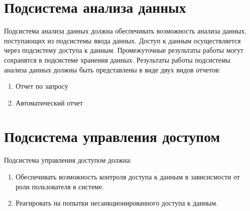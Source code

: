 \section{Подсистема анализа данных}
Подсистема анализа данных должна обеспечивать возможность анализа данных,
поступающих из подсистемы ввода данных. Доступ к данным осуществляется через
подсистему доступа к данным. Промежуточные результаты работы могут сохранятся в
подсистеме хранения данных.
Результаты работы подсистемы анализа данных должны быть представлены в виде двух
видов отчетов:

\begin{enumerate}
  \item Отчет по запросу
  \item Автоматический отчет   
\end{enumerate}

\section{Подсистема управления доступом}
Подсистема управления доступом должна:
\begin{enumerate}
  \item Обеспечивать возможность контроля доступа к данным в зависисмости от роли пользователя в системе.
  \item Реагировать на попытки несанкционированного доступа к данным.
\end{enumerate}